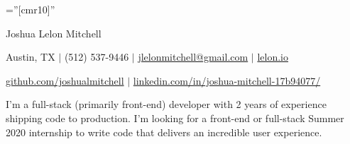 \documentclass[a4paper,10pt]{article}
\begin{document}

\pagestyle{empty} %

\font\fb=''[cmr10]'' %

\par{\centering
		{\Huge Joshua Lelon Mitchell
	}\par}
\par{\centering
		{
	Austin, TX
	$\mid$
	(512) 537-9446
	$\mid$
	\href {mailto:jlelonmitchell@gmail.com}{jlelonmitchell@gmail.com}
	$\mid$
	\href {https://lelon.io/}{lelon.io}
}\par}
\par{\centering
		{
	\href {https://github.com/joshualmitchell}{github.com/joshualmitchell}
	$\mid$
	\href {https://www.linkedin.com/in/joshua-mitchell-17b94077/}{linkedin.com/in/joshua-mitchell-17b94077/}
}\par}

\begin{center}
I'm a full-stack (primarily front-end) developer with 2 years of experience shipping code to production. I'm looking for a front-end or full-stack Summer 2020 internship to write code that delivers an incredible user experience. \end{center}

\end{document}
